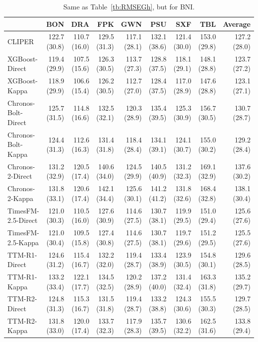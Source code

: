 \documentclass[number, 3p, 10pt, times]{elsarticle}
\begin{document}
\begin{table}[!ht]
\centering
\caption{Same as Table~\ref{tb:RMSEGh}, but for BNI.}
\label{tb:RMSEBn}
\footnotesize
\begin{tabular}{lrrrrrrrr}
\toprule
 & BON & DRA & FPK & GWN & PSU & SXF & TBL & Average \\
\midrule
CLIPER & 122.7 (30.8) & 110.7 (16.0) & 129.5 (31.3) & 117.1 (28.1) & 132.1 (38.6) & 121.4 (30.0) & 153.0 (29.8) & 127.2 (28.0) \\
XGBoost-Direct & 119.4 (29.9) & 107.5 (15.6) & 126.3 (30.5) & 113.7 (27.3) & 128.8 (37.5) & 118.1 (29.1) & 148.1 (28.8) & 123.7 (27.2) \\
XGBoost-Kappa & 118.9 (29.9) & 106.6 (15.4) & 126.2 (30.5) & 112.7 (27.0) & 128.4 (37.5) & 117.0 (28.9) & 147.6 (28.8) & 123.1 (27.1) \\
Chronos-Bolt-Direct & 125.7 (31.5) & 114.8 (16.6) & 132.5 (32.1) & 120.3 (28.9) & 135.4 (39.5) & 125.3 (30.9) & 156.7 (30.5) & 130.7 (28.7) \\
Chronos-Bolt-Kappa & 124.4 (31.3) & 112.6 (16.3) & 131.4 (31.8) & 118.4 (28.4) & 134.1 (39.1) & 124.1 (30.7) & 155.0 (30.2) & 129.2 (28.4) \\
Chronos-2-Direct & 131.2 (32.9) & 120.5 (17.4) & 140.6 (34.0) & 124.5 (29.9) & 140.5 (40.9) & 131.2 (32.3) & 169.1 (32.9) & 137.6 (30.2) \\
Chronos-2-Kappa & 131.8 (33.1) & 120.6 (17.4) & 142.1 (34.4) & 125.6 (30.1) & 141.2 (41.2) & 131.8 (32.6) & 168.4 (32.8) & 138.1 (30.4) \\
TimesFM-2.5-Direct & 121.0 (30.3) & 110.5 (16.0) & 127.6 (30.9) & 114.6 (27.5) & 130.7 (38.1) & 119.9 (29.5) & 151.0 (29.4) & 125.6 (27.6) \\
TimesFM-2.5-Kappa & 121.0 (30.4) & 109.5 (15.8) & 127.4 (30.8) & 114.6 (27.5) & 130.7 (38.1) & 119.7 (29.6) & 151.2 (29.5) & 125.5 (27.6) \\
TTM-R1-Direct & 124.6 (31.2) & 115.4 (16.7) & 132.2 (32.0) & 119.4 (28.7) & 133.4 (38.9) & 123.9 (30.5) & 154.8 (30.1) & 129.6 (28.5) \\
TTM-R1-Kappa & 133.2 (33.4) & 122.1 (17.7) & 134.5 (32.5) & 120.2 (28.9) & 137.2 (40.0) & 131.4 (32.4) & 163.3 (31.8) & 135.2 (29.7) \\
TTM-R2-Direct & 124.8 (31.3) & 115.3 (16.7) & 131.5 (31.8) & 119.4 (28.7) & 133.2 (38.8) & 124.3 (30.6) & 155.5 (30.3) & 129.7 (28.5) \\
TTM-R2-Kappa & 131.8 (33.0) & 120.0 (17.4) & 133.7 (32.3) & 117.9 (28.3) & 135.7 (39.5) & 130.6 (32.2) & 162.5 (31.6) & 133.8 (29.4) \\

\end{tabular}
\end{table}
\end{document}
